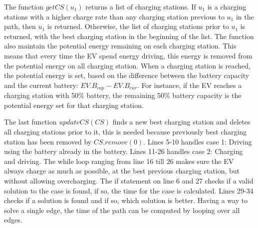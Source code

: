 The function $getCS(u_1)$ returns a list of charging stations. If $u_1$ is a charging stations with a higher charge rate than any charging station previous to $u_1$ in the path, then $u_1$ is returned. Otherwise, the list of charging stations prior to $u_1$ is returned, with the best charging station in the beginning of the list. The function also maintain the potential energy remaining on each charging station. This means that every time the EV spend energy driving, this energy is removed from the potential energy on all charging station. When a charging station is reached, the potential energy is set, based on the difference between the battery capacity and the current battery: $EV.B_{cap}-EV.B_{cur}$. For instance, if the EV reaches a charging station with 50\% battery, the remaining 50\% battery capacity is the potential energy set for that charging station.

The last function $updateCS(CS)$ finds a new best charging station and deletes all charging stations prior to it, this is needed because  previously best charging station has been removed by $CS.remove(0)$. Lines 5-10 handles case 1: Driving using the battery already in the battery. Lines 11-26 handles case 2: Charging and driving. The while loop ranging from line 16 till 26 makes sure the EV always charge as much as possible, at the best previous charging station, but without allowing overcharging. The if statement on line 6 and 27 checks if a valid solution to the case is found, if so, the time for the case is calculated. Lines 29-34 checks if a solution is found and if so, which solution is better. Having a way to solve a single edge, the time of the path can be computed by looping over all edges.



